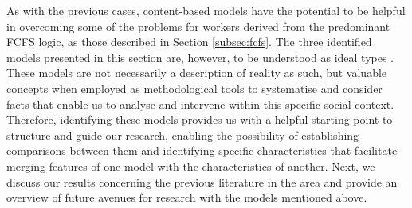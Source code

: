 As with the previous cases, content-based models have the potential to be helpful in overcoming some of the problems for workers derived from the predominant FCFS logic, as those described in Section \ref{subsec:fcfs}. The three identified models presented in this section are, however, to be understood as ideal types \cite{weber1904objektivitat}. These models are not necessarily a description of reality as such, but valuable concepts when employed as methodological tools to systematise and consider facts that enable us to analyse and intervene within this specific social context. Therefore, identifying these models provides us with a helpful starting point to structure and guide our research, enabling the possibility of establishing comparisons between them and identifying specific characteristics that facilitate merging features of one model with the characteristics of another. Next, we discuss our results concerning the previous literature in the area and provide an overview of future avenues for research with the models mentioned above.